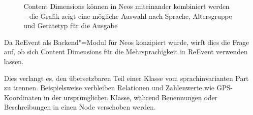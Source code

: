 \begin{figure}[ht!]
\begin{margincap}
\centering
{}
\caption[Abstrakte Darstellung des Content Dimensions Konzepts aus Neos CMS]{Content Dimensions können in Neos miteinander kombiniert werden -- die Grafik zeigt eine mögliche Auswahl nach Sprache, Altersgruppe und Gerätetyp für die Ausgabe}
\label{img:ContentDimensions}
\end{margincap}
\end{figure}

Da ReEvent als Backend"=Modul für Neos konzipiert wurde, wirft dies die Frage auf, ob sich Content Dimensions für die Mehrsprachigkeit in ReEvent verwenden lassen.

Dies verlangt es, den übersetzbaren Teil einer Klasse vom sprachinvarianten Part zu trennen. Beispielsweise verbleiben Relationen und Zahlenwerte wie GPS-Koordinaten in der ursprünglichen Klasse, während Benennungen oder Beschreibungen in einen Node verschoben werden.

